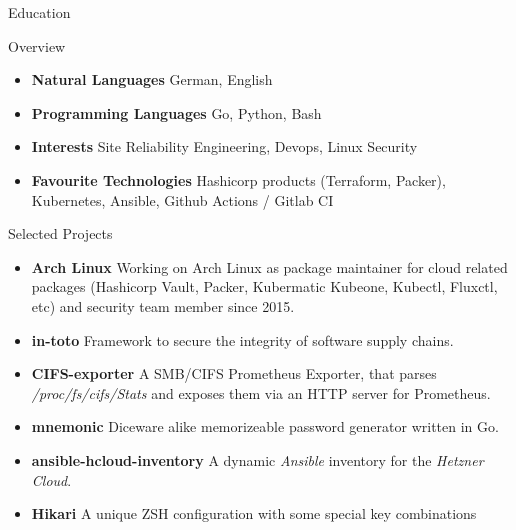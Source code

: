 \documentclass[]{mcdowellcv}
\begin{document}
\begin{cvsection}{Education}
\begin{cvsection}{Overview}
\begin{cvsubsection}{}{}{}
\begin{itemize}
\item \textbf{Natural Languages} German, English
\item \textbf{Programming Languages} Go, Python, Bash
\item \textbf{Interests} Site Reliability Engineering, Devops, Linux Security
\item \textbf{Favourite Technologies} Hashicorp products (Terraform, Packer), Kubernetes, Ansible, Github Actions / Gitlab CI
\end{itemize}
\end{cvsubsection}
\end{cvsection}

\end{cvsection}
\begin{cvsection}{Selected Projects}
\begin{cvsubsection}{}{}{}
\begin{itemize}
\item \textbf{Arch Linux} Working on Arch Linux as package maintainer for cloud related packages (Hashicorp Vault, Packer, Kubermatic Kubeone, Kubectl, Fluxctl, etc) and security team member since 2015.
\item \textbf{in-toto} Framework to secure the integrity of software supply chains.
\item \textbf{CIFS-exporter} A SMB/CIFS Prometheus Exporter, that parses \textit{/proc/fs/cifs/Stats} and exposes them via an HTTP server for Prometheus.
\item \textbf{mnemonic} Diceware alike memorizeable password generator written in Go.
\item \textbf{ansible-hcloud-inventory} A dynamic \textit{Ansible} inventory for the \textit{Hetzner Cloud}.
\item \textbf{Hikari} A unique ZSH configuration with some special key combinations
\end{itemize}
\end{cvsubsection}
\end{cvsection}
\end{document}
